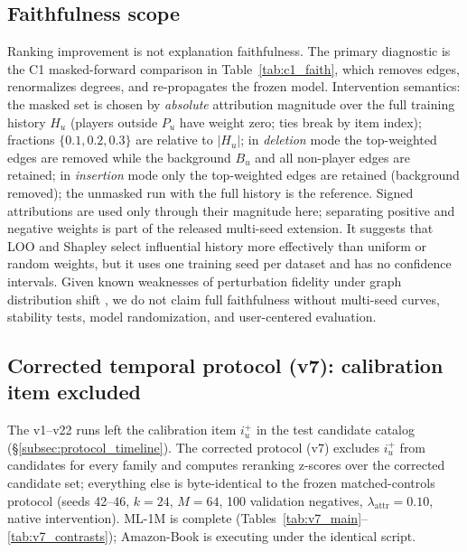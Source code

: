 \documentclass[pdflatex,sn-mathphys-num]{sn-jnl}
\begin{document}
\subsection{Faithfulness scope}\label{sec:explainability}
Ranking improvement is not explanation faithfulness. The primary diagnostic is the C1 masked-forward comparison in Table~\ref{tab:c1_faith}, which removes edges, renormalizes degrees, and re-propagates the frozen model. Intervention semantics: the masked set is chosen by \emph{absolute} attribution magnitude over the full training history $H_u$ (players outside $P_u$ have weight zero; ties break by item index); fractions $\{0.1,0.2,0.3\}$ are relative to $|H_u|$; in \emph{deletion} mode the top-weighted edges are removed while the background $B_u$ and all non-player edges are retained; in \emph{insertion} mode only the top-weighted edges are retained (background removed); the unmasked run with the full history is the reference. Signed attributions are used only through their magnitude here; separating positive and negative weights is part of the released multi-seed extension. It suggests that LOO and Shapley select influential history more effectively than uniform or random weights, but it uses one training seed per dataset and has no confidence intervals. Given known weaknesses of perturbation fidelity under graph distribution shift \cite{zheng2024robust,fang2023evaluating}, we do not claim full faithfulness without multi-seed curves, stability tests, model randomization, and user-centered evaluation.
\subsection{Corrected temporal protocol (v7): calibration item excluded}\label{subsec:v7_protocol}

The v1--v22 runs left the calibration item $i_u^+$ in the test candidate catalog (\S\ref{subsec:protocol_timeline}). The corrected protocol (v7) excludes $i_u^+$ from candidates for every family and computes reranking z-scores over the corrected candidate set; everything else is byte-identical to the frozen matched-controls protocol (seeds 42--46, $k=24$, $M=64$, 100 validation negatives, $\lambda_{\mathrm{attr}}=0.10$, native intervention). ML-1M is complete (Tables~\ref{tab:v7_main}--\ref{tab:v7_contrasts}); Amazon-Book is executing under the identical script.
\end{document}
